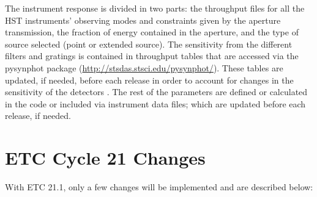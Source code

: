 The instrument response is divided in two parts: the throughput files for all the HST instruments' observing modes  and constraints given by  the aperture transmission, the  fraction of energy contained in the aperture, and the type of source selected (point or extended source). The sensitivity from the different filters and gratings is contained in throughput tables that are accessed via the pysynphot package (\url{http://stsdas.stsci.edu/pysynphot/}). These tables are updated, if needed, before each release in order to account for changes in the sensitivity of the detectors \citep{cdbs_2012}. The rest of the parameters are defined or calculated in the code or included via instrument data files; which are updated before each release, if needed.

\section{ETC Cycle 21 Changes}

With ETC 21.1, only a few changes will be implemented and are described below:

